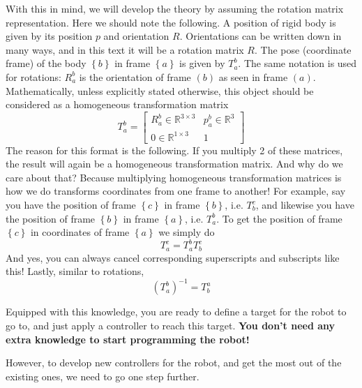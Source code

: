 With this in mind, we will develop the theory by
assuming the rotation matrix representation.
Here we should note the following.
A position of rigid body is given by its position $ p  $ and orientation $ R  $.
Orientations can be written down in many ways,
and in this text it will be a rotation matrix $ R  $.
The pose (coordinate frame) of the body $  \left\{ b \right\}     $ 
in frame $  \left\{ a \right\}     $ is given by
$ T_{ a }^{ b }  $.
The same notation is used for rotations: $ R_{ a }^{ b }  $
is the orientation of frame $ \left( b \right)   $ as seen in frame $ \left( a \right)   $.
Mathematically,
unless explicitly stated otherwise, this object should be considered as a 
homogeneous  transformation matrix 
\begin{equation}
T_{ a }^{ b }= 
\begin{bmatrix} 
	R_{ a }^{ b } \in \mathbb{R}^{3 \times 3} & p_{ a }^{ b } \in \mathbb{R}^{3} \\
	0 \in \mathbb{R}^{1 \times 3} & 1
\end{bmatrix} 
\end{equation}
The reason for this format is the following.
If you multiply 2 of these matrices, 
the result will again be a homogeneous transformation matrix.
And why do we care about that? Because multiplying
homogeneous transformation matrices is how we do transforms
coordinates from one frame to another!
For example, say you have the position of frame
$ \left\{ c \right\}   $ in frame $ \left\{ b \right\}   $,
i.e. $ T_{ b }^{ c }  $, and likewise you have the position
of frame $ \left\{ b \right\}   $ in frame $ \left\{ a \right\}   $,
i.e. $ T_{ a }^{ b }  $.
To get the position of frame $ \left\{ c \right\}   $ in 
coordinates of frame $ \left\{ a \right\}   $ we simply do
\begin{equation}
T_{ a }^{ c } = T_{ a }^{ b } T_{ b }^{ c }
\end{equation}
And yes, you can always cancel corresponding superscripts and subscripts 
like this!
Lastly, similar to rotations,
\begin{equation}
		(T_{ a }^{ b })^{ -1 } = T_{ b }^{ a }
\end{equation}

Equipped with this knowledge, you are ready to define a target
for the robot to go to, and just apply a controller 
to reach this target.
\textbf{You don't need any extra knowledge to start programming the robot!}

However, to develop new controllers for the robot, and get the most
out of the existing ones, we need to go one step further.

